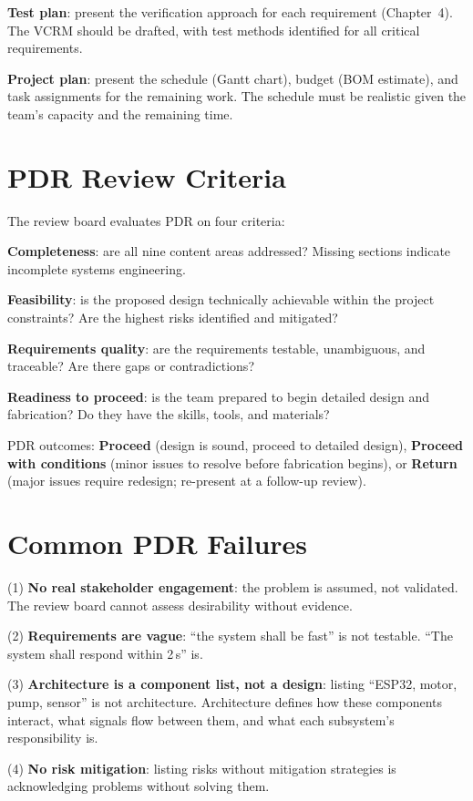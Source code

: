 \textbf{Test plan}: present the verification approach for each requirement (Chapter~4). The VCRM should be drafted, with test methods identified for all critical requirements.

\textbf{Project plan}: present the schedule (Gantt chart), budget (BOM estimate), and task assignments for the remaining work. The schedule must be realistic given the team's capacity and the remaining time.

\section{PDR Review Criteria}
The review board evaluates PDR on four criteria:

\textbf{Completeness}: are all nine content areas addressed? Missing sections indicate incomplete systems engineering.

\textbf{Feasibility}: is the proposed design technically achievable within the project constraints? Are the highest risks identified and mitigated?

\textbf{Requirements quality}: are the requirements testable, unambiguous, and traceable? Are there gaps or contradictions?

\textbf{Readiness to proceed}: is the team prepared to begin detailed design and fabrication? Do they have the skills, tools, and materials?

PDR outcomes: \textbf{Proceed} (design is sound, proceed to detailed design), \textbf{Proceed with conditions} (minor issues to resolve before fabrication begins), or \textbf{Return} (major issues require redesign; re-present at a follow-up review).

\section{Common PDR Failures}
(1) \textbf{No real stakeholder engagement}: the problem is assumed, not validated. The review board cannot assess desirability without evidence.

(2) \textbf{Requirements are vague}: ``the system shall be fast'' is not testable. ``The system shall respond within 2\,s'' is.

(3) \textbf{Architecture is a component list, not a design}: listing ``ESP32, motor, pump, sensor'' is not architecture. Architecture defines how these components interact, what signals flow between them, and what each subsystem's responsibility is.

(4) \textbf{No risk mitigation}: listing risks without mitigation strategies is acknowledging problems without solving them.

